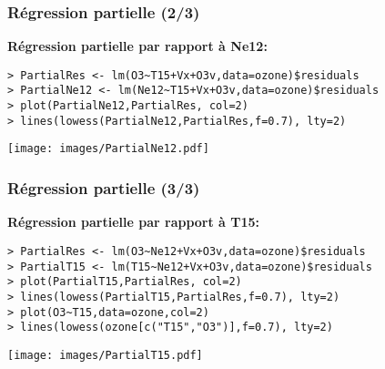 \documentclass{beamer}
\begin{document}
\begin{frame}[fragile]
\frametitle{\bf  R\'egression partielle (2/3)}
{\bf R\'egression partielle par rapport \`a Ne12:}
\begin{small}
\begin{verbatim}
> PartialRes <- lm(O3~T15+Vx+O3v,data=ozone)$residuals
> PartialNe12 <- lm(Ne12~T15+Vx+O3v,data=ozone)$residuals
> plot(PartialNe12,PartialRes, col=2)
> lines(lowess(PartialNe12,PartialRes,f=0.7), lty=2)
\end{verbatim}
\end{small}
\vspace{-0.6cm}

\centerline{\texttt{[image: images/PartialNe12.pdf]}}
\end{frame}


\begin{frame}[fragile]
\frametitle{\bf  R\'egression partielle (3/3)}
{\bf R\'egression partielle par rapport \`a T15:}
\begin{small}
\begin{verbatim}
> PartialRes <- lm(O3~Ne12+Vx+O3v,data=ozone)$residuals
> PartialT15 <- lm(T15~Ne12+Vx+O3v,data=ozone)$residuals
> plot(PartialT15,PartialRes, col=2)
> lines(lowess(PartialT15,PartialRes,f=0.7), lty=2)
> plot(O3~T15,data=ozone,col=2)
> lines(lowess(ozone[c("T15","O3")],f=0.7), lty=2)
\end{verbatim}
\end{small}\vspace{-0.8cm}


\centerline{\texttt{[image: images/PartialT15.pdf]}}
\end{frame}
\end{document}
